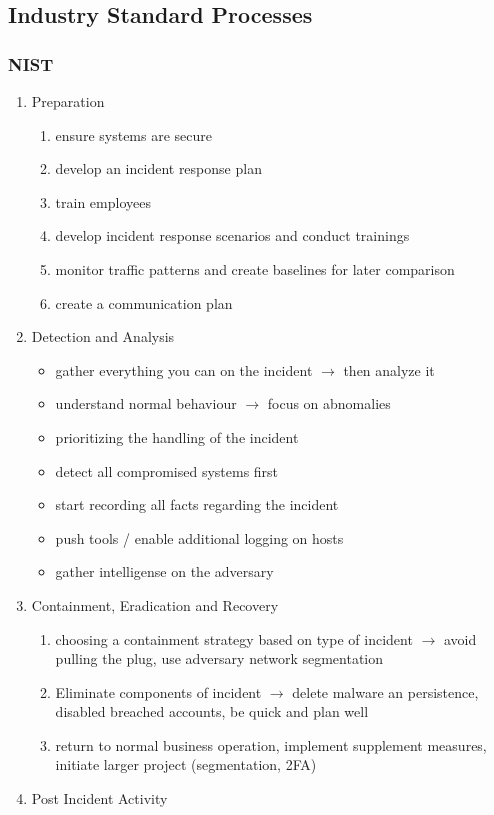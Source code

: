\subsection{Industry Standard Processes}
\subsubsection{NIST}
\begin{enumerate}
    \item Preparation
    \begin{enumerate}
        \item ensure systems are secure
        \item develop an incident response plan
        \item train employees
        \item develop incident response scenarios and conduct trainings
        \item monitor traffic patterns and create baselines for later comparison
        \item create a communication plan
    \end{enumerate}
    \item Detection and Analysis
    \begin{itemize}
        \item gather everything you can on the incident $\rightarrow$ then analyze it
        \item understand normal behaviour $\rightarrow$ focus on abnomalies
        \item prioritizing the handling of the incident
        \item detect all compromised systems first
        \item start recording all facts regarding the incident
        \item push tools / enable additional logging on hosts
        \item gather intelligense on the adversary
    \end{itemize}
    \item Containment, Eradication and Recovery
    \begin{enumerate}
        \item choosing a containment strategy based on type of incident $\rightarrow$ avoid pulling the plug, use adversary network segmentation
        \item Eliminate components of incident $\rightarrow$ delete malware an persistence, disabled breached accounts, be quick and plan well
        \item return to normal business operation, implement supplement measures, initiate larger project (segmentation, 2FA)
    \end{enumerate}
    \item Post Incident Activity
\end{enumerate}

